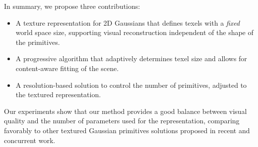 \noindent
In summary,
we propose three contributions:
\begin{itemize}
\item A texture representation for 2D Gaussians that defines texels with a \emph{fixed} world space size, supporting visual reconstruction independent of the shape of the primitives.
\item A progressive algorithm that adaptively determines texel size and allows for content-aware fitting of the scene.
\item A resolution-based solution to control the number of primitives,
adjusted to the textured representation.

\end{itemize}
Our experiments show that our method provides a good balance between visual quality and the number of parameters used for the representation, comparing favorably to other textured Gaussian primitives solutions proposed in recent and concurrent work.